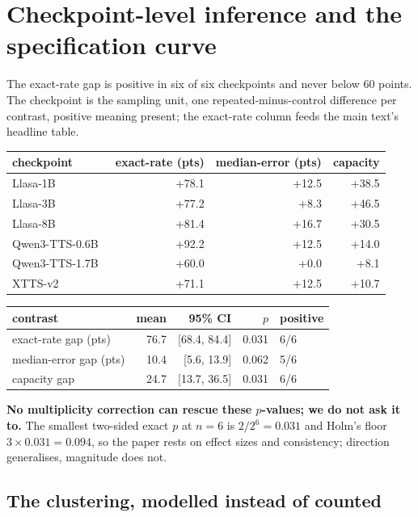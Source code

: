 \section{Checkpoint-level inference and the specification curve}
\label{sec:inference}

The exact-rate gap is positive in six of six checkpoints and never below $60$ points. The
checkpoint is the sampling unit, one repeated-minus-control difference per contrast, positive
meaning present; the exact-rate column feeds the main text's headline table.

\begin{center}
\begin{tabular}{lrrr}
\toprule
checkpoint & exact-rate (pts) & median-error (pts) & capacity \\
\midrule
Llasa-1B~\cite{ye2025llasa} & +78.1 & +12.5 & +38.5 \\
Llasa-3B & +77.2 & +8.3 & +46.5 \\
Llasa-8B & +81.4 & +16.7 & +30.5 \\
Qwen3-TTS-0.6B~\cite{hu2026qwen3tts} & +92.2 & +12.5 & +14.0 \\
Qwen3-TTS-1.7B & +60.0 & +0.0 & +8.1 \\
XTTS-v2~\cite{casanova2024xtts} & +71.1 & +12.5 & +10.7 \\
\bottomrule
\end{tabular}
\end{center}

\begin{center}
\begin{tabular}{lrrrl}
\toprule
contrast & mean & 95\% CI & $p$ & positive \\
\midrule
exact-rate gap (pts) & 76.7 & [68.4, 84.4] & 0.031 & 6/6 \\
median-error gap (pts) & 10.4 & [5.6, 13.9] & 0.062 & 5/6 \\
capacity gap & 24.7 & [13.7, 36.5] & 0.031 & 6/6 \\
\bottomrule
\end{tabular}
\end{center}

\noindent\textbf{No multiplicity correction can rescue these $p$-values; we do not ask it to.}
The smallest two-sided exact $p$ at $n=6$ is $2/2^6=0.031$ and Holm's floor $3\times0.031=0.094$,
so the paper rests on effect sizes and consistency; direction generalises, magnitude does not.

\subsection{The clustering, modelled instead of counted}

